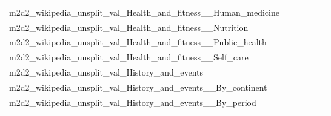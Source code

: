 \documentclass[dvipsnames]{article}
\begin{document}
\begin{appendix}
{\begin{longtable}{m{6cm}m{1.7cm}m{1.7cm}m{1.7cm}m{1.7cm}m{1.7cm}}
	m2d2\_wikipedia\_unsplit\_val\_Health\_and\_fitness\_\_Human\_medicine  & \colorbox[HTML]{fefee3}{\makebox[\mywidth][c]{9.14}} & \colorbox[HTML]{f8fcc1}{\makebox[\mywidth][c]{8.83}} & \colorbox[HTML]{ffffe5}{\makebox[\mywidth][c]{9.59}} & \colorbox[HTML]{bee496}{\makebox[\mywidth][c]{8.63}} & \colorbox[HTML]{77c578}{\makebox[\mywidth][c]{8.54}}\\
	m2d2\_wikipedia\_unsplit\_val\_Health\_and\_fitness\_\_Nutrition  & \colorbox[HTML]{fdfede}{\makebox[\mywidth][c]{8.91}} & \colorbox[HTML]{f4fab6}{\makebox[\mywidth][c]{8.68}} & \colorbox[HTML]{ffffe5}{\makebox[\mywidth][c]{9.40}} & \colorbox[HTML]{def2a6}{\makebox[\mywidth][c]{8.61}} & \colorbox[HTML]{77c578}{\makebox[\mywidth][c]{8.47}}\\
	m2d2\_wikipedia\_unsplit\_val\_Health\_and\_fitness\_\_Public\_health  & \colorbox[HTML]{fefee2}{\makebox[\mywidth][c]{10.75}} & \colorbox[HTML]{edf8b2}{\makebox[\mywidth][c]{10.47}} & \colorbox[HTML]{ffffe5}{\makebox[\mywidth][c]{11.14}} & \colorbox[HTML]{bde395}{\makebox[\mywidth][c]{10.37}} & \colorbox[HTML]{77c578}{\makebox[\mywidth][c]{10.30}}\\
	m2d2\_wikipedia\_unsplit\_val\_Health\_and\_fitness\_\_Self\_care  & \colorbox[HTML]{fdfede}{\makebox[\mywidth][c]{12.91}} & \colorbox[HTML]{e3f4aa}{\makebox[\mywidth][c]{12.49}} & \colorbox[HTML]{ffffe5}{\makebox[\mywidth][c]{13.61}} & \colorbox[HTML]{ccea9c}{\makebox[\mywidth][c]{12.42}} & \colorbox[HTML]{77c578}{\makebox[\mywidth][c]{12.28}}\\
	m2d2\_wikipedia\_unsplit\_val\_History\_and\_events  & \colorbox[HTML]{fdfedb}{\makebox[\mywidth][c]{13.65}} & \colorbox[HTML]{ebf7b0}{\makebox[\mywidth][c]{13.29}} & \colorbox[HTML]{ffffe5}{\makebox[\mywidth][c]{14.48}} & \colorbox[HTML]{daf0a4}{\makebox[\mywidth][c]{13.20}} & \colorbox[HTML]{77c578}{\makebox[\mywidth][c]{13.00}}\\
	m2d2\_wikipedia\_unsplit\_val\_History\_and\_events\_\_By\_continent  & \colorbox[HTML]{fdfede}{\makebox[\mywidth][c]{11.77}} & \colorbox[HTML]{e5f4ab}{\makebox[\mywidth][c]{11.44}} & \colorbox[HTML]{ffffe5}{\makebox[\mywidth][c]{12.36}} & \colorbox[HTML]{c5e799}{\makebox[\mywidth][c]{11.36}} & \colorbox[HTML]{77c578}{\makebox[\mywidth][c]{11.26}}\\
	m2d2\_wikipedia\_unsplit\_val\_History\_and\_events\_\_By\_period  & \colorbox[HTML]{fdfedf}{\makebox[\mywidth][c]{12.78}} & \colorbox[HTML]{f2fab5}{\makebox[\mywidth][c]{12.41}} & \colorbox[HTML]{ffffe5}{\makebox[\mywidth][c]{13.46}} & \colorbox[HTML]{e9f6af}{\makebox[\mywidth][c]{12.37}} & \colorbox[HTML]{77c578}{\makebox[\mywidth][c]{12.12}}\\

\end{longtable}}
\end{appendix}
\end{document}
